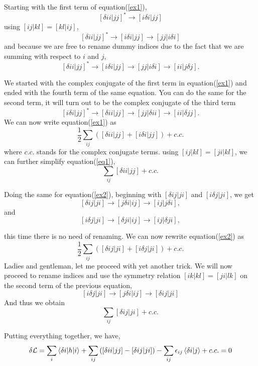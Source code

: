 \documentclass[a4paper]{article}
\begin{document}
Starting with the first term of equation(\ref{ex1}),
$$
[\delta i i | jj]^* \rightarrow [i\delta i | jj] 
$$
using $[ij|kl] = [kl|ij]$,
$$
[\delta i i | jj]^* \rightarrow [i\delta i | jj] \rightarrow [jj | i\delta i]  
$$
and because we are free to rename dummy indices due to the fact that we are summing with respect to $i$ and $j$,
$$
[\delta i i | jj]^* \rightarrow [i\delta i | jj] \rightarrow [jj | i\delta i]  \rightarrow [ii| j\delta j].
$$

We started with the complex conjugate of the first term in equation(\ref{ex1}) and ended with the fourth term of the same equation.
You can do the same for the second term, it will turn out to be the complex conjugate of the third term
$$
[i \delta i | jj]^* \rightarrow [\delta i i|jj] \rightarrow [jj|\delta ii] \rightarrow [ii|\delta jj].
$$
We can now write equation(\ref{ex1}) as
\begin{equation} \label{eq1}
\frac{1}{2}\sum_{ij} \left( [\delta i i | jj] + [i \delta i | jj]\right) + c.c.
\end{equation}
where $c.c.$ stands for the complex conjugate terms.
using $[ij|kl] = [ji|kl]$, we can further simplify equation(\ref{eq1}),
\begin{equation}
\sum_{ij} [\delta i i | jj]  + c.c.
\end{equation}



Doing the same for equation(\ref{ex2}), beginning with $[\delta i j | ji]$ and $[i \delta j | ji]$, we get
$$
[\delta i j | ji] \rightarrow [j\delta i|ij] \rightarrow [ij|j\delta i] ,
$$
and
$$
[i \delta j | ji] \rightarrow [\delta j i| ij] \rightarrow [ij|\delta j i] ,
$$

this time there is no need of renaming.
We can now rewrite equation(\ref{ex2}) as
$$
\frac{1}{2}\sum_{ij} \left( [\delta i j | ji] + [i \delta j | ji]\right) + c.c.
$$
Ladies and gentleman, let me proceed with yet another trick.
We will now proceed to rename indices and use the symmetry relation $[ik|kl] = [ji|lk]$ on the second term of the previous equation,
$$
[i \delta j | ji] \rightarrow [j \delta i | ij] \rightarrow [\delta ij|ji]
$$
And thus we obtain
\begin{equation}
\sum_{ij}  [\delta i j | ji]  + c.c.
\end{equation}



Putting everything together, we have,
\begin{equation} \label{hf-full}
\delta \mathcal{L} = \sum_i \braket{\delta i|h|i} + \sum_{ij} \left([\delta i i | jj] - [\delta i j | ji]\right) - \sum_{ij} \epsilon_{ij} \braket{\delta i|j} + c.c. = 0
\end{equation}
\end{document}
